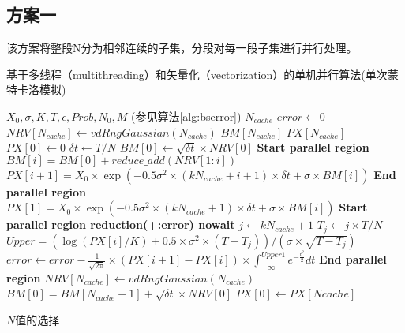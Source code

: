 \subsection{方案一}
该方案将整段N分为相邻连续的子集，分段对每一段子集进行并行处理。
\begin{algorithm}
  \caption{基于多线程（multithreading）和矢量化（vectorization）的单机并行算法(单次蒙特卡洛模拟)}
  \label{alg:omp1}
  \begin{algorithmic}[1]
    \Require $X_0, \sigma, K, T, \epsilon, Prob, N_0, M$ (参见算法\ref{alg:bserror})
    \Require $N_{cache}$ 
    \State $error \gets 0$
    \State $NRV[N_{cache}] \gets vdRngGaussian(N_{cache})$ 
    \State $BM[N_{cache}]$
    \State $PX[N_{cache}]$
    \State $PX[0] \gets 0$
    \State $\delta t \gets T/N$
    \State $BM[0] \gets \sqrt{\delta t} \times NRV[0]$
    \State \textbf{Start parallel region}
    \State $BM[i] = BM[0] + reduce\_add(NRV[1:i])$ 
    \State $PX[i+1] = X_0 \times \exp(-0.5 \sigma^2 \times (kN_{cache}+i+1) \times \delta t + \sigma \times BM[i])$
    \EndFor
    \State \textbf{End parallel region}
    $PX[1] = X_0 \times \exp(-0.5 \sigma^2 \times (kN_{cache}+1) \times \delta t + \sigma \times BM[i])$
    \State \textbf{Start parallel region reduction(+:error) nowait}
    \State $j \gets kN_{cache}+1$
    \State $T_j \gets {j \times T}/{N}$
    \State $Upper = (\log(PX[i]/K)+0.5\times \sigma^2 \times (T-T_j))/(\sigma \times \sqrt{T-T_j})$
    \State $error \gets error - \frac{1}{\sqrt{2\pi}}\times (PX[i+1]-PX[i])\times \int_{-\infty}^{Upper1}e^{-\frac{t^2}{2}}dt$
    \EndFor
    \State \textbf{End parallel region}
    \State $NRV[N_{cache}] \gets vdRngGaussian(N_{cache})$ 
    \State $BM[0] = BM[N_{cache}-1] + \sqrt{\delta t}\times NRV[0]$
    \State $PX[0] \gets PX[Ncache]$
    \EndFor
    
    \EndProcedure
  \end{algorithmic}
\end{algorithm}











$N$值的选择

